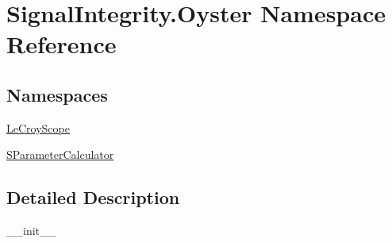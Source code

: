 \hypertarget{namespaceSignalIntegrity_1_1Oyster}{}\section{Signal\+Integrity.\+Oyster Namespace Reference}
\label{namespaceSignalIntegrity_1_1Oyster}
\subsection*{Namespaces}
\begin{DoxyCompactItemize}
\item 
 \hyperlink{namespaceSignalIntegrity_1_1Oyster_1_1LeCroyScope}{Le\+Croy\+Scope}
\item 
 \hyperlink{namespaceSignalIntegrity_1_1Oyster_1_1SParameterCalculator}{S\+Parameter\+Calculator}
\end{DoxyCompactItemize}


\subsection{Detailed Description}
\begin{DoxyVerb}__init__\end{DoxyVerb}
 